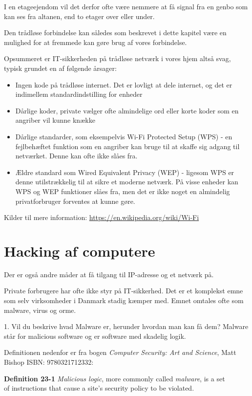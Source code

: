 \documentclass[a4paper,11pt,notitlepage]{report}
\begin{document}
I en etageejendom vil det derfor ofte være nemmere at få signal fra en genbo som kan ses fra altanen, end to etager over eller under.


Den trådløse forbindelse kan således som beskrevet i dette kapitel være en mulighed for at fremmede kan gøre brug af vores forbindelse.

Opsummeret er IT-sikkerheden på trådløse netværk i vores hjem altså svag, typisk grundet en af følgende årsager:
\begin{itemize}
\item Ingen kode på trådløse internet. Det er lovligt at dele internet, og det er indimellem standardindstilling for enheder
\item Dårlige koder, private vælger ofte almindelige ord eller korte koder som en angriber vil kunne knække
\item Dårlige standarder, som eksempelvis Wi-Fi
Protected Setup (WPS) - en fejlbehæftet funktion som en angriber kan bruge til at skaffe sig adgang til netværket. Denne kan ofte ikke slåes fra.
\item Ældre standard som Wired Equivalent Privacy (WEP) - ligesom WPS er denne utilstrækkelig til at sikre et moderne netværk. På visse enheder kan WPS og WEP  funktioner slåes fra, men det er ikke noget en almindelig privatforbruger forventes at kunne gøre.
\end{itemize}


Kilder til mere information:
\url{https://en.wikipedia.org/wiki/Wi-Fi}

\chapter{Hacking af computere}
\label{malware}

Der er også andre måder at få tilgang til IP-adresse og et netværk på.

Private forbrugere har ofte ikke styr på IT-sikkerhed. Det er et komplekst emne som selv virksomheder i Danmark stadig kæmper med. Emnet omtales ofte som malware, virus og orme.

1.  Vil du beskrive hvad Malware er, herunder hvordan man kan få dem?
Malware står for malicious software og er software med skadelig logik.

Definitionen nedenfor er fra bogen \emph{Computer Security: Art and Science}, Matt Bishop ISBN: 9780321712332:

{\bf Definition 23-1} \emph{Malicious logic}, more commonly called \emph{malware}, is a set\\
 of instructions that cause a site's security policy to be violated.
\end{document}

